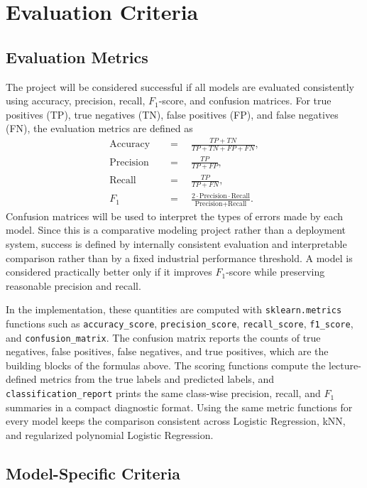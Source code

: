 \documentclass[12pt]{article}
\begin{document}
\section{Evaluation Criteria}

\subsection{Evaluation Metrics}

The project will be considered successful if all models are evaluated consistently using accuracy, precision, recall, $F_1$-score, and confusion matrices. For true positives (TP), true negatives (TN), false positives (FP), and false negatives (FN), the evaluation metrics are defined as
\[
\begin{aligned}
\text{Accuracy} \quad &=\quad \frac{TP + TN}{TP + TN + FP + FN}, \\
\text{Precision} \quad &=\quad \frac{TP}{TP + FP}, \\
\text{Recall} \quad &=\quad \frac{TP}{TP + FN}, \\
F_1 \quad &=\quad
\frac{2 \cdot \text{Precision} \cdot \text{Recall}}
{\text{Precision} + \text{Recall}}.
\end{aligned}
\]
Confusion matrices will be used to interpret the types of errors made by each model. Since this is a comparative modeling project rather than a deployment system, success is defined by internally consistent evaluation and interpretable comparison rather than by a fixed industrial performance threshold. A model is considered practically better only if it improves $F_1$-score while preserving reasonable precision and recall.

In the implementation, these quantities are computed with \texttt{sklearn.metrics} functions such as \texttt{accuracy\_score}, \texttt{precision\_score}, \texttt{recall\_score}, \texttt{f1\_score}, and \texttt{confusion\_matrix}. The confusion matrix reports the counts of true negatives, false positives, false negatives, and true positives, which are the building blocks of the formulas above. The scoring functions compute the lecture-defined metrics from the true labels and predicted labels, and \texttt{classification\_report} prints the same class-wise precision, recall, and $F_1$ summaries in a compact diagnostic format. Using the same metric functions for every model keeps the comparison consistent across Logistic Regression, kNN, and regularized polynomial Logistic Regression.

\subsection{Model-Specific Criteria}
\end{document}
